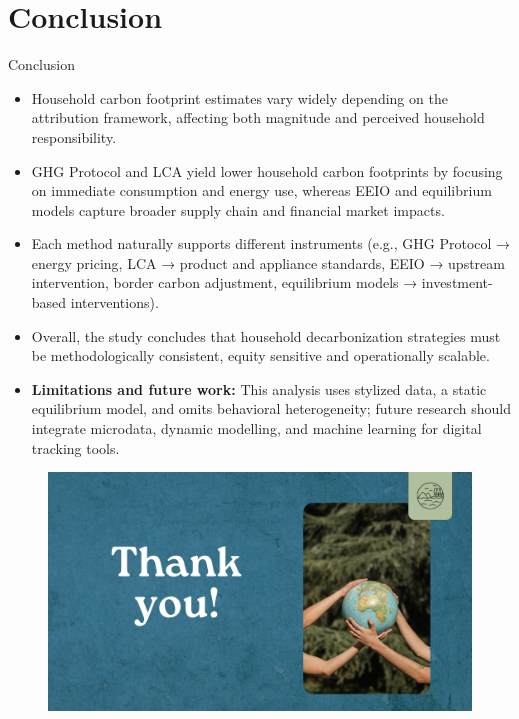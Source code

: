 \documentclass{beamer}
\begin{document}
\section{Conclusion}
\begin{frame}{Conclusion}
  \vspace{-2.5em}
\footnotesize
\begin{itemize}
\item Household carbon footprint estimates vary widely depending on the attribution framework, affecting both magnitude and perceived household responsibility.
\pause
\item GHG Protocol and LCA yield lower household carbon footprints by focusing on immediate consumption and energy use, whereas EEIO and equilibrium models capture broader supply chain and financial market impacts.
\pause
\item Each method naturally supports different instruments (e.g., GHG Protocol → energy pricing, LCA → product and appliance standards, EEIO → upstream intervention, border carbon adjustment, equilibrium models → investment-based interventions).
\pause
\item Overall, the study concludes that household decarbonization strategies must be methodologically consistent, equity sensitive and operationally scalable.    
\end{itemize}
\begin{itemize}
  \pause
\item \textbf{Limitations and future work: }This analysis uses stylized data, a static equilibrium model, and omits behavioral heterogeneity; future research should integrate microdata, dynamic modelling, and machine learning for digital tracking tools.
\end{itemize}
  \end{frame}

  \begin{frame}{}
  
\begin{figure}
\includegraphics[width=\linewidth]{Thank you 2.png}
\end{figure}
\end{frame}
\end{document}
